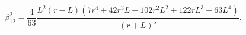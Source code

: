 \begin{equation}
\beta_{12}^{2}=\frac{4}{63}\frac{ L^2(r-L)(7r^4+42r^3L+102r^2L^2+122rL^3+63L^4)}{(r+L)^5}.
\label{beta4}
\end{equation}

